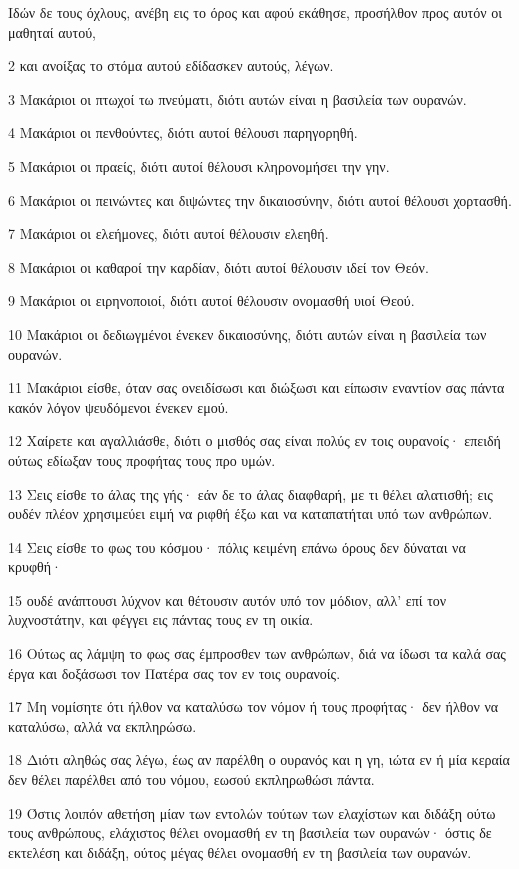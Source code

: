 \par Ιδών δε τους όχλους, ανέβη εις το όρος και αφού εκάθησε, προσήλθον προς αυτόν οι μαθηταί αυτού,
\par 2 και ανοίξας το στόμα αυτού εδίδασκεν αυτούς, λέγων.
\par 3 Μακάριοι οι πτωχοί τω πνεύματι, διότι αυτών είναι η βασιλεία των ουρανών.
\par 4 Μακάριοι οι πενθούντες, διότι αυτοί θέλουσι παρηγορηθή.
\par 5 Μακάριοι οι πραείς, διότι αυτοί θέλουσι κληρονομήσει την γην.
\par 6 Μακάριοι οι πεινώντες και διψώντες την δικαιοσύνην, διότι αυτοί θέλουσι χορτασθή.
\par 7 Μακάριοι οι ελεήμονες, διότι αυτοί θέλουσιν ελεηθή.
\par 8 Μακάριοι οι καθαροί την καρδίαν, διότι αυτοί θέλουσιν ιδεί τον Θεόν.
\par 9 Μακάριοι οι ειρηνοποιοί, διότι αυτοί θέλουσιν ονομασθή υιοί Θεού.
\par 10 Μακάριοι οι δεδιωγμένοι ένεκεν δικαιοσύνης, διότι αυτών είναι η βασιλεία των ουρανών.
\par 11 Μακάριοι είσθε, όταν σας ονειδίσωσι και διώξωσι και είπωσιν εναντίον σας πάντα κακόν λόγον ψευδόμενοι ένεκεν εμού.
\par 12 Χαίρετε και αγαλλιάσθε, διότι ο μισθός σας είναι πολύς εν τοις ουρανοίς· επειδή ούτως εδίωξαν τους προφήτας τους προ υμών.
\par 13 Σεις είσθε το άλας της γής· εάν δε το άλας διαφθαρή, με τι θέλει αλατισθή; εις ουδέν πλέον χρησιμεύει ειμή να ριφθή έξω και να καταπατήται υπό των ανθρώπων.
\par 14 Σεις είσθε το φως του κόσμου· πόλις κειμένη επάνω όρους δεν δύναται να κρυφθή·
\par 15 ουδέ ανάπτουσι λύχνον και θέτουσιν αυτόν υπό τον μόδιον, αλλ' επί τον λυχνοστάτην, και φέγγει εις πάντας τους εν τη οικία.
\par 16 Ούτως ας λάμψη το φως σας έμπροσθεν των ανθρώπων, διά να ίδωσι τα καλά σας έργα και δοξάσωσι τον Πατέρα σας τον εν τοις ουρανοίς.
\par 17 Μη νομίσητε ότι ήλθον να καταλύσω τον νόμον ή τους προφήτας· δεν ήλθον να καταλύσω, αλλά να εκπληρώσω.
\par 18 Διότι αληθώς σας λέγω, έως αν παρέλθη ο ουρανός και η γη, ιώτα εν ή μία κεραία δεν θέλει παρέλθει από του νόμου, εωσού εκπληρωθώσι πάντα.
\par 19 Όστις λοιπόν αθετήση μίαν των εντολών τούτων των ελαχίστων και διδάξη ούτω τους ανθρώπους, ελάχιστος θέλει ονομασθή εν τη βασιλεία των ουρανών· όστις δε εκτελέση και διδάξη, ούτος μέγας θέλει ονομασθή εν τη βασιλεία των ουρανών.
